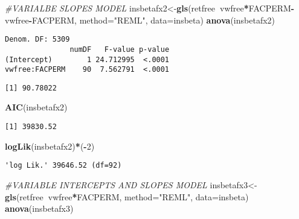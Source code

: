 \documentclass[]{book}
\newenvironment{Shaded}{\begin{snugshade}}{\end{snugshade}}
\newcommand{\CommentTok}[1]{\textcolor[rgb]{0.56,0.35,0.01}{\textit{#1}}}
\newcommand{\DataTypeTok}[1]{\textcolor[rgb]{0.13,0.29,0.53}{#1}}
\newcommand{\DecValTok}[1]{\textcolor[rgb]{0.00,0.00,0.81}{#1}}
\newcommand{\KeywordTok}[1]{\textcolor[rgb]{0.13,0.29,0.53}{\textbf{#1}}}
\newcommand{\NormalTok}[1]{#1}
\newcommand{\OperatorTok}[1]{\textcolor[rgb]{0.81,0.36,0.00}{\textbf{#1}}}
\newcommand{\StringTok}[1]{\textcolor[rgb]{0.31,0.60,0.02}{#1}}
\begin{document}
\begin{Shaded}
\begin{Highlighting}[]
\CommentTok{#VARIALBE SLOPES MODEL}
\NormalTok{insbetafx2<-}\KeywordTok{gls}\NormalTok{(retfree}\OperatorTok{~}\NormalTok{vwfree}\OperatorTok{*}\NormalTok{FACPERM}\OperatorTok{-}\NormalTok{vwfree}\OperatorTok{-}\NormalTok{FACPERM, }\DataTypeTok{method=}\StringTok{"REML"}\NormalTok{, }\DataTypeTok{data=}\NormalTok{insbeta)}
\KeywordTok{anova}\NormalTok{(insbetafx2)}
\end{Highlighting}
\end{Shaded}

\begin{verbatim}
Denom. DF: 5309 
               numDF   F-value p-value
(Intercept)        1 24.712995  <.0001
vwfree:FACPERM    90  7.562791  <.0001
\end{verbatim}

\begin{Shaded}
\end{Shaded}

\begin{verbatim}
[1] 90.78022
\end{verbatim}

\begin{Shaded}
\begin{Highlighting}[]
\KeywordTok{AIC}\NormalTok{(insbetafx2)}
\end{Highlighting}
\end{Shaded}

\begin{verbatim}
[1] 39830.52
\end{verbatim}

\begin{Shaded}
\begin{Highlighting}[]
\KeywordTok{logLik}\NormalTok{(insbetafx2)}\OperatorTok{*}\NormalTok{(}\OperatorTok{-}\DecValTok{2}\NormalTok{)}
\end{Highlighting}
\end{Shaded}

\begin{verbatim}
'log Lik.' 39646.52 (df=92)
\end{verbatim}

\begin{Shaded}
\begin{Highlighting}[]
\CommentTok{#VARIABLE INTERCEPTS AND SLOPES MODEL}
\NormalTok{insbetafx3<-}\KeywordTok{gls}\NormalTok{(retfree}\OperatorTok{~}\NormalTok{vwfree}\OperatorTok{*}\NormalTok{FACPERM, }\DataTypeTok{method=}\StringTok{"REML"}\NormalTok{, }\DataTypeTok{data=}\NormalTok{insbeta)}
\KeywordTok{anova}\NormalTok{(insbetafx3)}
\end{Highlighting}
\end{Shaded}
\end{document}
